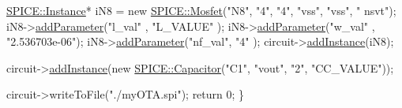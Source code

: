 \begin{DoxyCodeInclude}
    \mbox{\hyperlink{class_s_p_i_c_e_1_1_instance}{SPICE::Instance}}* iN8 = \textcolor{keyword}{new} \mbox{\hyperlink{class_s_p_i_c_e_1_1_mosfet}{SPICE::Mosfet}}(\textcolor{stringliteral}{"N8"}, \textcolor{stringliteral}{"4"}, \textcolor{stringliteral}{"4"}, \textcolor{stringliteral}{"vss"}, \textcolor{stringliteral}{"vss"}, \textcolor{stringliteral}{"
      nsvt"});
    iN8->\mbox{\hyperlink{class_s_p_i_c_e_1_1_instance_a8d69bbbea5ece0949e100c464e412f20}{addParameter}}(\textcolor{stringliteral}{"l\_val"} , \textcolor{stringliteral}{"L\_VALUE"}     );
    iN8->\mbox{\hyperlink{class_s_p_i_c_e_1_1_instance_a8d69bbbea5ece0949e100c464e412f20}{addParameter}}(\textcolor{stringliteral}{"w\_val"} , \textcolor{stringliteral}{"2.536703e-06"});
    iN8->\mbox{\hyperlink{class_s_p_i_c_e_1_1_instance_a8d69bbbea5ece0949e100c464e412f20}{addParameter}}(\textcolor{stringliteral}{"nf\_val"}, \textcolor{stringliteral}{"4"}           );
    circuit->\mbox{\hyperlink{class_s_p_i_c_e_1_1_circuit_a7bb4a4532643568ab1ac2c229185a88e}{addInstance}}(iN8);

    circuit->\mbox{\hyperlink{class_s_p_i_c_e_1_1_circuit_a7bb4a4532643568ab1ac2c229185a88e}{addInstance}}(\textcolor{keyword}{new} \mbox{\hyperlink{class_s_p_i_c_e_1_1_capacitor}{SPICE::Capacitor}}(\textcolor{stringliteral}{"C1"}, \textcolor{stringliteral}{"vout"}, \textcolor{stringliteral}{"2"}, \textcolor{stringliteral}{"CC\_VALUE"}));

    circuit->writeToFile(\textcolor{stringliteral}{"./myOTA.spi"});
    \textcolor{keywordflow}{return} 0;
\}

\end{DoxyCodeInclude}


